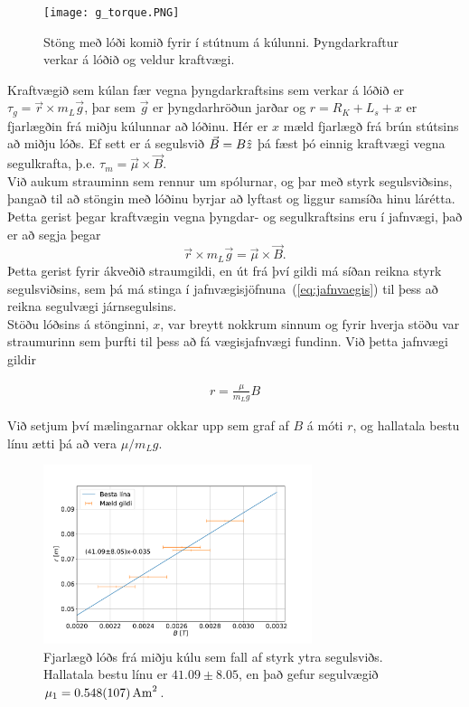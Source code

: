 \documentclass[11pt]{article}
\begin{document}
\begin{figure}[H]
  \centering
    \texttt{[image: g\_torque.PNG]}
    \caption{Stöng með lóði komið fyrir í stútnum á kúlunni. Þyngdarkraftur verkar á lóðið og veldur kraftvægi.}
    \label{fig:g_torque} 
\end{figure}

Kraftvægið sem kúlan fær vegna þyngdarkraftsins sem verkar á lóðið er $\tau_g = \Vec{r} \times m_L\Vec{g}$, þar sem $\Vec{g}$ er þyngdarhröðun jarðar og $r = R_K + L_s + x$ er fjarlægðin frá miðju kúlunnar að lóðinu. Hér er $x$ mæld fjarlægð frá brún stútsins að miðju lóðs. Ef sett er á segulsvið $\Vec{B}= B \Hat{z}$ þá fæst þó einnig kraftvægi vegna segulkrafta, þ.e. $\tau_m =\Vec{\mu} \times \Vec{B}$. \\
Við aukum strauminn sem rennur um spólurnar, og þar með styrk segulsviðsins, þangað til að stöngin með lóðinu byrjar að lyftast og liggur samsíða hinu lárétta. Þetta gerist þegar kraftvægin vegna þyngdar- og segulkraftsins eru í jafnvægi, það er að segja þegar
\begin{equation}
\Vec{r} \times m_L\Vec{g} = \Vec{\mu} \times \Vec{B}.  \label{eq:jafnvaegis}  
\end{equation}
Þetta gerist fyrir ákveðið straumgildi, en út frá því gildi má síðan reikna styrk segulsviðsins, sem þá má stinga í jafnvægisjöfnuna~(\ref{eq:jafnvaegis}) til þess að reikna segulvægi járnsegulsins. \\
Stöðu lóðsins á stönginni, $x$, var breytt nokkrum sinnum og fyrir hverja stöðu var straumurinn sem þurfti til þess að fá vægisjafnvægi fundinn. Við þetta jafnvægi gildir

\begin{align}
r = \frac{\mu}{m_L g}B
\end{align}

Við setjum því mælingarnar okkar upp sem graf af $B$ á móti $r$, og hallatala bestu línu ætti þá að vera $\mu/m_L g$.

\begin{figure}[H]
    \centering
    \includegraphics[width=0.7\textwidth]{Hluti_1.PDF}
    \caption{Fjarlægð lóðs frá miðju kúlu sem fall af styrk ytra segulsviðs. Hallatala bestu línu er $41.09 \pm 8.05$, en það gefur segulvægið $\mu_1 = \SI{0.548 \pm 0.107}{A m^2}$.}
    \label{fig:hluti 1}
\end{figure}
\end{document}
